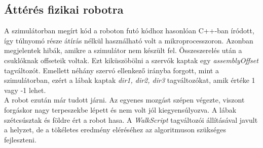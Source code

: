 \documentclass{article}
\begin{document}
\subsection{Áttérés fizikai robotra}
A szimulátorban megírt kód a roboton futó kódhoz hasonlóan C++-ban íródott, így túlnyomó része átírás nélkül használható volt a mikroprocesszoron. Azonban megjelentek hibák, amikre a szimulátor nem készült fel. Összeszerelés után a csuklóknak offseteik voltak. Ezt kiküszöbölni a szervók kaptak egy \textit{assemblyOffset} tagváltozót. Emellett néhány szervó ellenkező irányba forgott, mint a szimulátorban, ezért a lábak kaptak \textit{dir1, dir2, dir3} tagváltozókat, amik értéke 1 vagy -1 lehet.\\
A robot ezután már tudott járni. Az egyenes mozgást szépen végezte, viszont forgáskor nagy terpeszekbe lépett és nem volt jól kiegyensúlyozva. A lábak szétcsúsztak és földre ért a robot hasa. A \textit{WalkScript} tagváltozói állításával javult a helyzet, de a tökéletes eredmény eléréséhez az algoritmuson szükséges fejleszteni.
\end{document}
